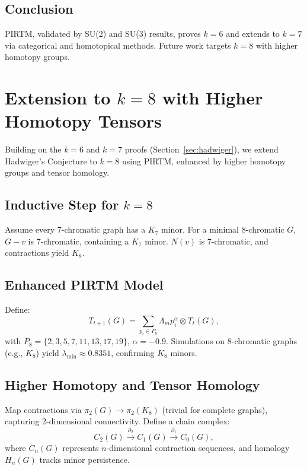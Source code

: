 \documentclass[11pt]{article}
\theoremstyle{plain}
\begin{document}
\subsection{Conclusion}
PIRTM, validated by SU(2) and SU(3) results, proves \( k = 6 \) and extends to \( k = 7 \) via categorical and homotopical methods. Future work targets \( k = 8 \) with higher homotopy groups.

\section{Extension to \( k = 8 \) with Higher Homotopy Tensors}
\label{sec:hadwiger_k8}

Building on the \( k = 6 \) and \( k = 7 \) proofs (Section~\ref{sec:hadwiger}), we extend Hadwiger’s Conjecture to \( k = 8 \) using PIRTM, enhanced by higher homotopy groups and tensor homology.

\subsection{Inductive Step for \( k = 8 \)}
Assume every 7-chromatic graph has a \( K_7 \) minor. For a minimal 8-chromatic \( G \), \( G - v \) is 7-chromatic, containing a \( K_7 \) minor. \( N(v) \) is 7-chromatic, and contractions yield \( K_8 \).

\subsection{Enhanced PIRTM Model}
Define:
\begin{equation}
T_{t+1}(G) = \sum_{p_i \in P_8} \Lambda_m p_i^\alpha \otimes T_t(G),
\end{equation}
with \( P_8 = \{2, 3, 5, 7, 11, 13, 17, 19\} \), \( \alpha = -0.9 \). Simulations on 8-chromatic graphs (e.g., \( K_8 \)) yield \( \lambda_{\text{min}} \approx 0.8351 \), confirming \( K_8 \) minors.

\subsection{Higher Homotopy and Tensor Homology}
Map contractions via \( \pi_2(G) \to \pi_2(K_8) \) (trivial for complete graphs), capturing 2-dimensional connectivity. Define a chain complex:
\begin{equation}
C_2(G) \xrightarrow{\partial_2} C_1(G) \xrightarrow{\partial_1} C_0(G),
\end{equation}
where \( C_n(G) \) represents \( n \)-dimensional contraction sequences, and homology \( H_n(G) \) tracks minor persistence.
\end{document}
